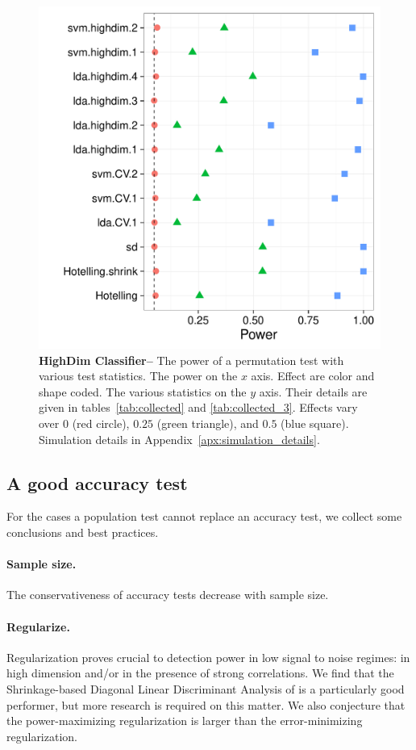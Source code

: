 \documentclass[12pt,a4paper]{article}
\theoremstyle{definition}
\begin{document}
\begin{figure}[ht]
\centering
	  \includegraphics[width=0.7\linewidth]{"art/2016-08-15 20:07:55"}
	  \caption{
\textbf{HighDim Classifier--} 
		The power of a permutation test with various test statistics. 
		The power on the $x$ axis. 
		Effect are color and shape coded. 
		The various statistics on the $y$ axis. 
		Their details are given in tables~\ref{tab:collected} and \ref{tab:collected_3}. 
		Effects vary over $0$ (red circle), $0.25$ (green triangle), and $0.5$ (blue square). 
		Simulation details in Appendix~\ref{apx:simulation_details}.
} 
	\label{fig:highdim}
\end{figure}





\subsection{A good accuracy test}
For the cases a population test cannot replace an accuracy test, we collect some conclusions and best practices.

\paragraph{Sample size.} The conservativeness of accuracy tests decrease with sample size. 


\paragraph{Regularize.}
Regularization proves crucial to detection power in low signal to noise regimes: in high dimension and\slash or in the presence of strong correlations. 
We find that the Shrinkage-based Diagonal Linear Discriminant Analysis of \cite{pang_shrinkage-based_2009} is a particularly good performer, but more research is required on this matter. 
We also conjecture that the power-maximizing regularization is larger than the error-minimizing regularization.
\end{document}

